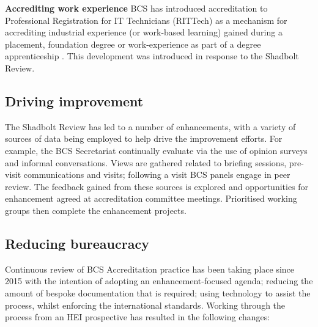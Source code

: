 \documentclass[sigconf]{acmart}
\begin{document}


{\textbf{Accrediting work experience}} BCS has introduced
accreditation to Professional Registration for IT Technicians
(RITTech) as a mechanism for accrediting industrial experience (or
work-based learning) gained during a placement, foundation degree or
work-experience as part of a degree apprenticeship
\cite[p8]{BCS2018a}. This development was introduced in response to
the Shadbolt Review.

\subsection{Driving improvement}

The Shadbolt Review has led to a number of enhancements, with a
variety of sources of data being employed to help drive the improvement
efforts. For example, the BCS Secretariat continually evaluate via the
use of opinion surveys and informal conversations. Views are gathered
related to briefing sessions, pre-visit communications and visits;
following a visit BCS panels engage in peer review. The feedback
gained from these sources is explored and opportunities for
enhancement agreed at accreditation committee meetings. Prioritised
working groups then complete the enhancement projects.

\subsection{Reducing bureaucracy}

Continuous review of BCS Accreditation practice has been taking place
since 2015 with the intention of adopting an enhancement-focused
agenda; reducing the amount of bespoke documentation that is required;
using technology to assist the process, whilst enforcing the
international standards. Working through the process from an HEI
prospective has resulted in the following changes:
\end{document}
